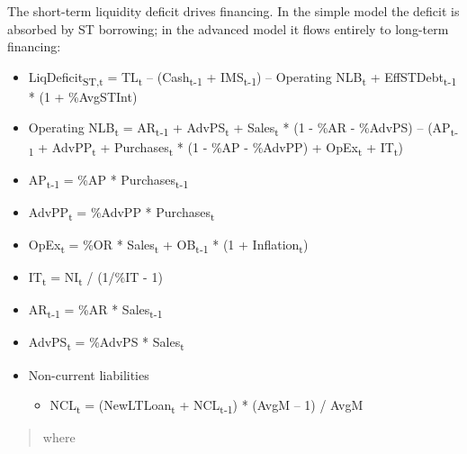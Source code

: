 \documentclass[12pt,a4paper]{article}
\begin{document}
The short-term liquidity deficit drives financing. In the simple model
the deficit is absorbed by ST borrowing; in the advanced model it flows
entirely to long-term financing:

\begin{itemize}
\item
  LiqDeficit\textsubscript{ST,t} = TL\textsubscript{t} --
  (Cash\textsubscript{t-1} + IMS\textsubscript{t-1}) -- Operating
  NLB\textsubscript{t} + EffSTDebt\textsubscript{t-1} * (1 +
  \%AvgSTInt)
\item
  Operating NLB\textsubscript{t} = AR\textsubscript{t-1} +
  AdvPS\textsubscript{t} + Sales\textsubscript{t} * (1 - \%AR - \%AdvPS)
  -- (AP\textsubscript{t-1} + AdvPP\textsubscript{t} +
  Purchases\textsubscript{t} * (1 - \%AP - \%AdvPP) +
  OpEx\textsubscript{t} + IT\textsubscript{t})
\item
  AP\textsubscript{t-1} = \%AP * Purchases\textsubscript{t-1}
\item
  AdvPP\textsubscript{t} = \%AdvPP * Purchases\textsubscript{t}
\item
  OpEx\textsubscript{t} = \%OR * Sales\textsubscript{t} +
  OB\textsubscript{t-1} * (1 + Inflation\textsubscript{t})
\item
  IT\textsubscript{t} = NI\textsubscript{t} / (1/\%IT - 1)
\item
  AR\textsubscript{t-1} = \%AR * Sales\textsubscript{t-1}
\item
  AdvPS\textsubscript{t} = \%AdvPS * Sales\textsubscript{t}
\end{itemize}

\begin{itemize}
\item
  Non-current liabilities

  \begin{itemize}
  \item
    NCL\textsubscript{t} = (NewLTLoan\textsubscript{t} +
    NCL\textsubscript{t-1}) * (AvgM -- 1) / AvgM
  \end{itemize}
\end{itemize}

\begin{quote}
where
\end{quote}
\end{document}
